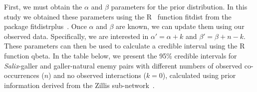 \documentclass[12pt]{article}
\begin{document}
  First, we must obtain the $\alpha$ and $\beta$ parameters for the prior distribution. In this study we obtained these parameters using the R~\citep{R} function fitdist from the package fitdistrplus~\citep{fitdistrplus}. Once $\alpha$ and $\beta$ are known, we can update them using our observed data. Specifically, we are interested in $\alpha'=\alpha+k$ and $\beta'=\beta+n-k$. These parameters can then be used to calculate a credible interval using the R~\citep{R} function qbeta. In the table below, we present the 95\% credible intervals for \emph{Salix}-galler and galler-natural enemy pairs with different numbers of observed co-occurrences ($n$) and no observed interactions ($k=0$), calculated using prior information derived from the Zillis sub-network~\citep{Kopelke2017}.

      \medskip
\end{document}
